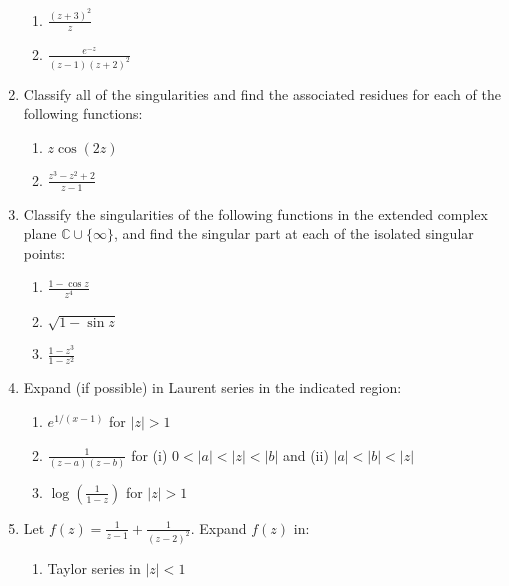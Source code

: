 \documentclass[a4paper,10pt]{article}
\begin{document}
\begin{enumerate}
 	\begin{enumerate}
 		\item $\frac{(z + 3)^2}{z}$
 		
 		\item $\frac{e^{-z}}{(z - 1)(z + 2)^2}$
 	\end{enumerate}
 	
 	\item Classify all of the singularities and find the associated residues for each of the following functions:
 	
 	\begin{enumerate}
 		\item $z \cos(2z)$
 		
 		\item $\frac{z^3 - z^2 + 2}{z - 1}$
 	\end{enumerate}
 	
 	\item Classify the singularities of the following functions in the extended complex plane $\mathbb{C} \cup \{\infty\}$, and find the singular part at each of the isolated singular points:
 	
 	\begin{enumerate}
 		\item $\frac{1 - \cos z}{z^4}$
 		
 		\item $\sqrt{1 - \sin z}$
 		
 		\item $\frac{1 - z^3}{1 - z^2}$
 	\end{enumerate}
 	
 	\item Expand (if possible) in Laurent series in the indicated region:
 	
 	\begin{enumerate}
 		\item $e^{1/(x - 1)}$ for $|z| > 1$
 		
 		\item $\frac{1}{(z - a)(z - b)}$ for (i) $0 < |a| < |z| < |b|$ and (ii) $|a| < |b| < |z|$
 		
 		\item $\log \left( \frac{1}{1 - z} \right)$ for $|z| > 1$
 	\end{enumerate}
 	
 	\item Let $f(z) = \frac{1}{z - 1} + \frac{1}{(z - 2)^2}$. Expand $f(z)$ in:
 	
 	\begin{enumerate}
 		\item Taylor series in $|z| < 1$
 		

\end{enumerate}
\end{enumerate}
\end{document}
